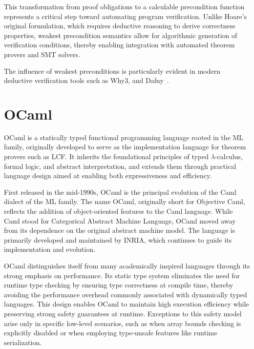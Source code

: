 This transformation from proof obligations to a calculable precondition function represents a critical step toward automating 
program verification. Unlike Hoare's original formulation, which requires deductive reasoning to derive correctness properties, 
weakest precondition semantics allow for algorithmic generation of verification conditions, thereby enabling integration 
with automated theorem provers and SMT solvers.

The influence of weakest preconditions is particularly evident in modern deductive verification tools such as \textsf{Why3}, 
and \textsf{Dafny}~\cite{boogie11why3, Leino10}.


\section{OCaml}
\label{sec:OCaml}


OCaml is a statically typed functional programming language rooted in the ML family, originally developed 
to serve as the implementation language for theorem provers such as LCF. It inherits the foundational principles 
of typed $\lambda$-calculus, formal logic, and abstract interpretation, and extends them through practical language design 
aimed at enabling both expressiveness and efficiency.

First released in the mid-1990s, OCaml is the principal evolution of the Caml dialect of the ML family. The name OCaml, 
originally short for Objective Caml, reflects the addition of object-oriented features to the Caml language. While Caml 
stood for Categorical Abstract Machine Language, OCaml moved away from its dependence on the original abstract machine model. 
The language is primarily developed and maintained by INRIA, which continues to guide its implementation and evolution.

OCaml distinguishes itself from many academically inspired languages through its strong emphasis on performance. Its static 
type system eliminates the need for runtime type checking by ensuring type correctness at compile time, thereby avoiding the 
performance overhead commonly associated with dynamically typed languages. This design enables OCaml to maintain high 
execution efficiency while preserving strong safety guarantees at runtime. Exceptions to this safety model arise only in 
specific low-level scenarios, such as when array bounds checking is explicitly disabled or when employing type-unsafe features 
like runtime serialization.

